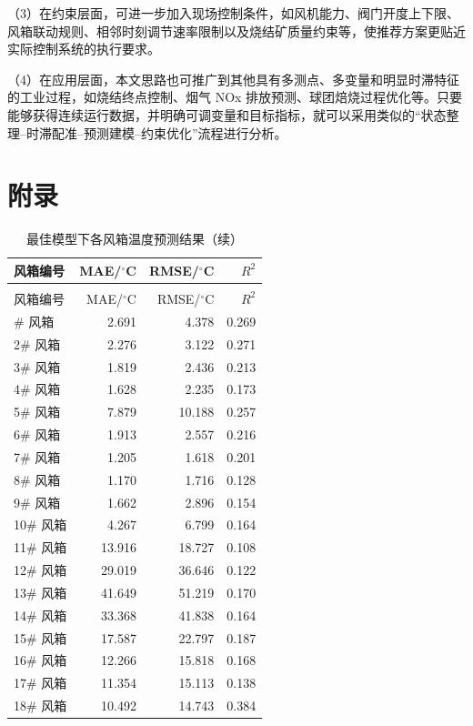\documentclass[UTF8,a4paper,zihao=-4]{ctexart}
\begin{document}
（3）在约束层面，可进一步加入现场控制条件，如风机能力、阀门开度上下限、风箱联动规则、相邻时刻调节速率限制以及烧结矿质量约束等，使推荐方案更贴近实际控制系统的执行要求。

（4）在应用层面，本文思路也可推广到其他具有多测点、多变量和明显时滞特征的工业过程，如烧结终点控制、烟气 NOx 排放预测、球团焙烧过程优化等。只要能够获得连续运行数据，并明确可调变量和目标指标，就可以采用类似的“状态整理--时滞配准--预测建模--约束优化”流程进行分析\cite{openai2026codex}。

\printbibliography[title={参考文献}]
\newpage

\section{附录}
\begin{longtable}{lrrr}
\caption{最佳模型下各风箱温度预测结果}\\
\toprule
风箱编号 & MAE/$^\circ$C & RMSE/$^\circ$C & $R^2$ \\
\midrule
\endfirsthead
\caption[]{最佳模型下各风箱温度预测结果（续）}\\
\toprule
风箱编号 & MAE/$^\circ$C & RMSE/$^\circ$C & $R^2$ \\
\midrule
\endhead
\bottomrule
\endfoot
1\# 风箱 & 2.691 & 4.378 & 0.269 \\
2\# 风箱 & 2.276 & 3.122 & 0.271 \\
3\# 风箱 & 1.819 & 2.436 & 0.213 \\
4\# 风箱 & 1.628 & 2.235 & 0.173 \\
5\# 风箱 & 7.879 & 10.188 & 0.257 \\
6\# 风箱 & 1.913 & 2.557 & 0.216 \\
7\# 风箱 & 1.205 & 1.618 & 0.201 \\
8\# 风箱 & 1.170 & 1.716 & 0.128 \\
9\# 风箱 & 1.662 & 2.896 & 0.154 \\
10\# 风箱 & 4.267 & 6.799 & 0.164 \\
11\# 风箱 & 13.916 & 18.727 & 0.108 \\
12\# 风箱 & 29.019 & 36.646 & 0.122 \\
13\# 风箱 & 41.649 & 51.219 & 0.170 \\
14\# 风箱 & 33.368 & 41.838 & 0.164 \\
15\# 风箱 & 17.587 & 22.797 & 0.187 \\
16\# 风箱 & 12.266 & 15.818 & 0.168 \\
17\# 风箱 & 11.354 & 15.113 & 0.138 \\
18\# 风箱 & 10.492 & 14.743 & 0.384 \\
\end{longtable}
\end{document}
